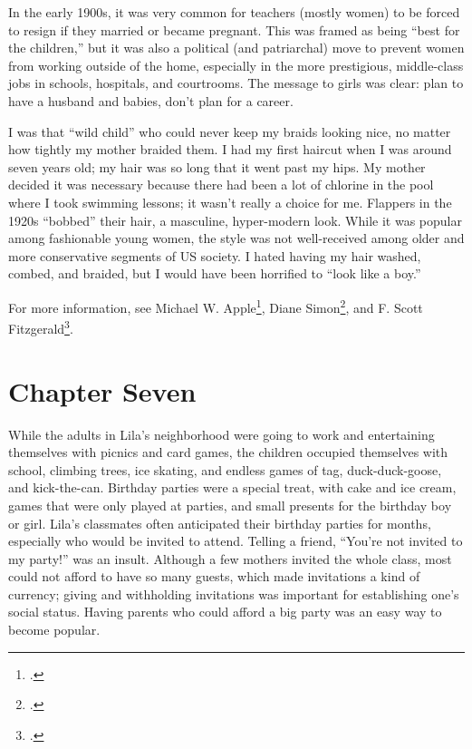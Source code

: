 \documentclass[
  letterpaper,
]{book}
\begin{document}
In the early 1900s, it was very common for teachers (mostly women) to be
forced to resign if they married or became pregnant. This was framed as
being ``best for the children,'' but it was also a political (and
patriarchal) move to prevent women from working outside of the home,
especially in the more prestigious, middle-class jobs in schools,
hospitals, and courtrooms. The message to girls was clear: plan to have
a husband and babies, don't plan for a career.

I was that ``wild child'' who could never keep my braids looking nice,
no matter how tightly my mother braided them. I had my first haircut
when I was around seven years old; my hair was so long that it went past
my hips. My mother decided it was necessary because there had been a lot
of chlorine in the pool where I took swimming lessons; it wasn't really
a choice for me. Flappers in the 1920s ``bobbed'' their hair, a
masculine, hyper-modern look. While it was popular among fashionable
young women, the style was not well-received among older and more
conservative segments of US society. I hated having my hair washed,
combed, and braided, but I would have been horrified to ``look like a
boy.''

For more information, see Michael W. Apple\footnote{.}, Diane Simon\footnote{.}, and F. Scott Fitzgerald\footnote{.}.


\chapter{Chapter Seven}\label{chapter-seven}

While the adults in Lila's neighborhood were going to work and
entertaining themselves with picnics and card games, the children
occupied themselves with school, climbing trees, ice skating, and
endless games of tag, duck-duck-goose, and kick-the-can. Birthday
parties were a special treat, with cake and ice cream, games that were
only played at parties, and small presents for the birthday boy or girl.
Lila's classmates often anticipated their birthday parties for months,
especially who would be invited to attend. Telling a friend, ``You're
not invited to my party!'' was an insult. Although a few mothers invited
the whole class, most could not afford to have so many guests, which
made invitations a kind of currency; giving and withholding invitations
was important for establishing one's social status. Having parents who
could afford a big party was an easy way to become popular.
\end{document}
